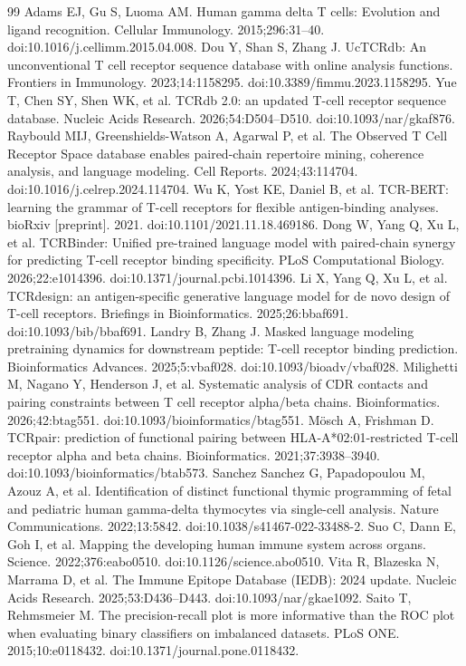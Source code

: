 \documentclass[10pt]{article}
\begin{document}
\begin{thebibliography}{99}
 Adams EJ, Gu S, Luoma AM.
Human gamma delta T cells: Evolution and ligand recognition.
Cellular Immunology. 2015;296:31--40. doi:10.1016/j.cellimm.2015.04.008.
 Dou Y, Shan S, Zhang J.
UcTCRdb: An unconventional T cell receptor sequence database with online analysis
functions. Frontiers in Immunology. 2023;14:1158295.
doi:10.3389/fimmu.2023.1158295.
 Yue T, Chen SY, Shen WK, et al.
TCRdb 2.0: an updated T-cell receptor sequence database.
Nucleic Acids Research. 2026;54:D504--D510.
doi:10.1093/nar/gkaf876.
 Raybould MIJ, Greenshields-Watson A, Agarwal P, et al.
The Observed T Cell Receptor Space database enables paired-chain repertoire
mining, coherence analysis, and language modeling.
Cell Reports. 2024;43:114704. doi:10.1016/j.celrep.2024.114704.
 Wu K, Yost KE, Daniel B, et al.
TCR-BERT: learning the grammar of T-cell receptors for flexible antigen-binding
analyses. bioRxiv [preprint]. 2021. doi:10.1101/2021.11.18.469186.
 Dong W, Yang Q, Xu L, et al.
TCRBinder: Unified pre-trained language model with paired-chain synergy for
predicting T-cell receptor binding specificity.
PLoS Computational Biology. 2026;22:e1014396. doi:10.1371/journal.pcbi.1014396.
 Li X, Yang Q, Xu L, et al.
TCRdesign: an antigen-specific generative language model for de novo design of
T-cell receptors. Briefings in Bioinformatics. 2025;26:bbaf691.
doi:10.1093/bib/bbaf691.
 Landry B, Zhang J.
Masked language modeling pretraining dynamics for downstream peptide:
T-cell receptor binding prediction. Bioinformatics Advances. 2025;5:vbaf028.
doi:10.1093/bioadv/vbaf028.
 Milighetti M, Nagano Y, Henderson J, et al.
Systematic analysis of CDR contacts and pairing constraints between T cell
receptor alpha/beta chains.
Bioinformatics. 2026;42:btag551. doi:10.1093/bioinformatics/btag551.
 M\"osch A, Frishman D.
TCRpair: prediction of functional pairing between HLA-A*02:01-restricted
T-cell receptor alpha and beta chains.
Bioinformatics. 2021;37:3938--3940. doi:10.1093/bioinformatics/btab573.
 Sanchez Sanchez G, Papadopoulou M, Azouz A, et al.
Identification of distinct functional thymic programming of fetal and pediatric
human gamma-delta thymocytes via single-cell analysis.
Nature Communications. 2022;13:5842. doi:10.1038/s41467-022-33488-2.
 Suo C, Dann E, Goh I, et al.
Mapping the developing human immune system across organs.
Science. 2022;376:eabo0510. doi:10.1126/science.abo0510.
 Vita R, Blazeska N, Marrama D, et al.
The Immune Epitope Database (IEDB): 2024 update.
Nucleic Acids Research. 2025;53:D436--D443. doi:10.1093/nar/gkae1092.
 Saito T, Rehmsmeier M.
The precision-recall plot is more informative than the ROC plot when evaluating
binary classifiers on imbalanced datasets.
PLoS ONE. 2015;10:e0118432. doi:10.1371/journal.pone.0118432.
\end{thebibliography}
\end{document}
